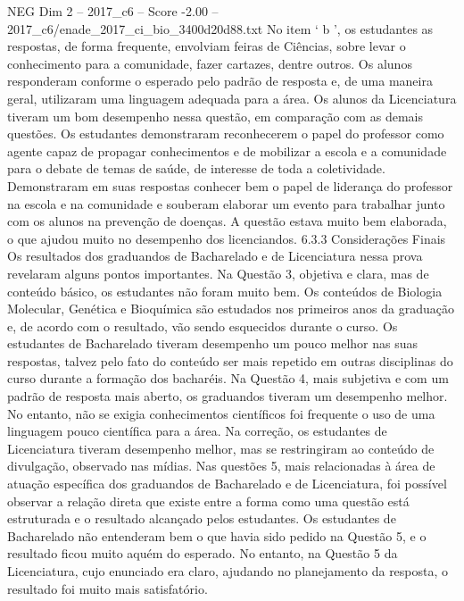 \begin{textsample}{NEG Dim 2 – 2017\_c6 – Score -2.00 – 2017\_c6/enade\_2017\_ci\_bio\_3400d20d88.txt}
No item ‘ b ’, os estudantes as respostas, de forma frequente, envolviam feiras de Ciências, sobre levar o conhecimento para a comunidade, fazer cartazes, dentre outros.
Os alunos responderam conforme o esperado pelo padrão de resposta e, de uma maneira geral, utilizaram uma linguagem adequada para a área.
Os alunos da Licenciatura tiveram um bom desempenho nessa questão, em comparação com as demais questões.
Os estudantes demonstraram reconhecerem o papel do professor como agente capaz de propagar conhecimentos e de mobilizar a escola e a comunidade para o debate de temas de saúde, de interesse de toda a coletividade.
Demonstraram em suas respostas conhecer bem o papel de liderança do professor na escola e na comunidade e souberam elaborar um evento para trabalhar junto com os alunos na prevenção de doenças.
A questão estava muito bem elaborada, o que ajudou muito no desempenho dos licenciandos. 6.3.3 Considerações Finais Os resultados dos graduandos de Bacharelado e de Licenciatura nessa prova revelaram alguns pontos importantes.
Na Questão 3, objetiva e clara, mas de conteúdo básico, os estudantes não foram muito bem.
Os conteúdos de Biologia Molecular, Genética e Bioquímica são estudados nos primeiros anos da graduação e, de acordo com o resultado, vão sendo esquecidos durante o curso.
Os estudantes de Bacharelado tiveram desempenho um pouco melhor nas suas respostas, talvez pelo fato do conteúdo ser mais repetido em outras disciplinas do curso durante a formação dos bacharéis.
Na Questão 4, mais subjetiva e com um padrão de resposta mais aberto, os graduandos tiveram um desempenho melhor.
No entanto, não se exigia conhecimentos científicos foi frequente o uso de uma linguagem pouco científica para a área.
Na correção, os estudantes de Licenciatura tiveram desempenho melhor, mas se restringiram ao conteúdo de divulgação, observado nas mídias.
Nas questões 5, mais relacionadas à área de atuação específica dos graduandos de Bacharelado e de Licenciatura, foi possível observar a relação direta que existe entre a forma como uma questão está estruturada e o resultado alcançado pelos estudantes.
Os estudantes de Bacharelado não entenderam bem o que havia sido pedido na Questão 5, e o resultado ficou muito aquém do esperado.
No entanto, na Questão 5 da Licenciatura, cujo enunciado era claro, ajudando no planejamento da resposta, o resultado foi muito mais satisfatório.

\end{textsample}
